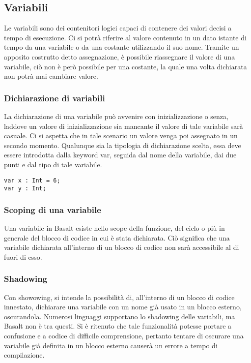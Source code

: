 \subsection{Variabili}
Le variabili sono dei contenitori logici capaci di contenere dei valori decisi a tempo di esecuzione. Ci si potrà riferire 
al valore contenuto in un dato istante di tempo da una variabile o da una costante utilizzando il suo nome. Tramite un apposito 
costrutto detto assegnazione, è possibile riassegnare il valore di una variabile, ciò non è però possibile per una costante, la quale 
una volta dichiarata non potrà mai cambiare valore. 

\subsubsection{Dichiarazione di variabili}
La dichiarazione di una variabile può avvenire con inizializzazione o senza, laddove un valore di inizializzazione sia mancante il valore 
di tale variabile sarà casuale. Ci si aspetta che in tale scenario un valore venga poi assegnato in un secondo momento. Qualunque sia la 
tipologia di dichiarazione scelta, essa deve essere introdotta dalla keyword var, seguida dal nome della variabile, dai due punti e dal tipo 
di tale variabile.

\vspace{0.5cm}

\begin{lstlisting}[frame=single]
var x : Int = 6;
var y : Int;
\end{lstlisting}

\subsubsection{Scoping di una variabile}
Una variabile in Basalt esiste nello scope della funzione, del ciclo o più in generale del blocco di codice in cui è stata dichiarata. Ciò 
significa che una variabile dichiarata all’interno di un blocco di codice non sarà accessibile al di fuori di esso.

\subsubsection{Shadowing}
Con showowing, si intende la possibilità di, all'interno di un blocco di codice innestato, dichiarare una variabile con un nome già usato
in un blocco esterno, oscurandola. Numerosi linguaggi supportano lo shadowing delle variabili, ma Basalt non è tra questi. Si è ritenuto 
che tale funzionalità potesse portare a confusione e a codice di difficile comprensione, pertanto tentare di oscurare una variabile già definita
in un blocco esterno causerà un errore a tempo di compilazione.

